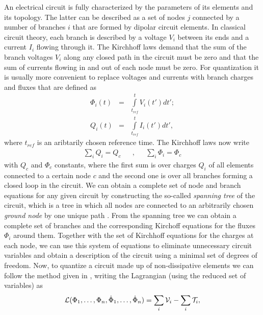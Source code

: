 An electrical circuit is fully characterized by the parameters of its elements and its topology. The latter can be described as a set of nodes $j$ connected by a number of branches $i$ that are formed by dipolar circuit elements. In classical circuit theory, each branch is described by a voltage $V_i$ between its ends and a current $I_{i}$ flowing through it. The Kirchhoff laws demand that the sum of the branch voltages $V_i$ along any closed path in the circuit must be zero and that the sum of currents flowing in and out of each node must be zero. For quantization it is usually more convenient to replace voltages and currents with branch charges and fluxes that are defined as
%
\begin{eqnarray}
\Phi_i(t) & = & \int\limits_{t_{ref}}^t V_i(t') dt' ;\\
Q_i(t) & = & \int\limits_{t_{ref}}^t I_i(t') dt',
\end{eqnarray}
%
where $t_{ref}$ is an aribtarily chosen reference time. The Kirchhoff laws now write
%
\begin{align}
\sum\limits_{i} Q_i  =  Q_c & & , & & \sum\limits_{i}\Phi_i = \Phi_c \label{eq:kirchhoff_charge}
\end{align}
%
with $Q_c$ and $\Phi_c$ constants, where the first sum is over charges $Q_i$ of all elements connected to a certain node $c$ and the second one is over all branches forming a closed loop in the circuit. We can obtain a complete set of node and branch equations for any given circuit by constructing the so-called {\it spanning tree} of the circuit, which is a tree in which all nodes are connected to an arbitrarily chosen {\it ground node} by one unique path \citep{devoret_quantum_1995}. From the spanning tree we can obtain a complete set of branches and the corresponding Kirchoff equations for the fluxes $\Phi_i$ around them. Together with the set of Kirchhoff equations for the charges at each node, we can use this system of equations to eliminate unnecessary circuit variables and obtain a description of the circuit using a minimal set of degrees of freedom. Now, to quantize a circuit made up of non-dissipative elements we can follow the method given in \cite{yurke_quantum_1984}, writing the Lagrangian (using the reduced set of variables) as 
%
\begin{equation}
\begin{mathcal}L\end{mathcal}(\Phi_1,\hdots,\Phi_n,\dot{\Phi}_1,\hdots,\dot{\Phi}_n) = \sum\limits_i \begin{mathcal}V\end{mathcal}_i - \sum\limits_i \begin{mathcal}T\end{mathcal}_i \label{eq:circuit_lagrangian},
\end{equation}
